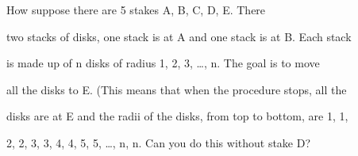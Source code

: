 How suppose there are 5 stakes A, B, C, D, E. There

two stacks of disks, one stack is at A and one stack is at B. Each stack

is made up of n disks of radius 1, 2, 3, \ldots, n. The goal is to move

all the disks to E. (This means that when the procedure stops, all the

disks are at E and the radii of the disks, from top to bottom, are 1, 1,

2, 2, 3, 3, 4, 4, 5, 5, \ldots, n, n. Can you do this without stake D?

